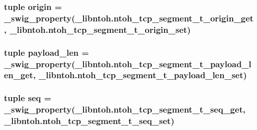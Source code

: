 \hypertarget{classlibntoh_1_1ntoh__tcp__segment__t_a8b9d7517c215a6690dc57a59f2e58a46}{
\subsubsection[{origin}]{\setlength{\rightskip}{0pt plus 5cm}tuple origin = {\bf \-\_\-swig\-\_\-property}(\-\_\-libntoh.\-ntoh\-\_\-tcp\-\_\-segment\-\_\-t\-\_\-origin\-\_\-get, \-\_\-libntoh.\-ntoh\-\_\-tcp\-\_\-segment\-\_\-t\-\_\-origin\-\_\-set)\hspace{0.3cm}{\ttfamily [static]}}}\label{classlibntoh_1_1ntoh__tcp__segment__t_a8b9d7517c215a6690dc57a59f2e58a46}
\hypertarget{classlibntoh_1_1ntoh__tcp__segment__t_a2d1aae70ae5f00aa8688e5a4004af497}{
\subsubsection[{payload\-\_\-len}]{\setlength{\rightskip}{0pt plus 5cm}tuple payload\-\_\-len = {\bf \-\_\-swig\-\_\-property}(\-\_\-libntoh.\-ntoh\-\_\-tcp\-\_\-segment\-\_\-t\-\_\-payload\-\_\-len\-\_\-get, \-\_\-libntoh.\-ntoh\-\_\-tcp\-\_\-segment\-\_\-t\-\_\-payload\-\_\-len\-\_\-set)\hspace{0.3cm}{\ttfamily [static]}}}\label{classlibntoh_1_1ntoh__tcp__segment__t_a2d1aae70ae5f00aa8688e5a4004af497}
\hypertarget{classlibntoh_1_1ntoh__tcp__segment__t_a716df55a3150c1225ef8612669f6b901}{
\subsubsection[{seq}]{\setlength{\rightskip}{0pt plus 5cm}tuple seq = {\bf \-\_\-swig\-\_\-property}(\-\_\-libntoh.\-ntoh\-\_\-tcp\-\_\-segment\-\_\-t\-\_\-seq\-\_\-get, \-\_\-libntoh.\-ntoh\-\_\-tcp\-\_\-segment\-\_\-t\-\_\-seq\-\_\-set)\hspace{0.3cm}{\ttfamily [static]}}}\label{classlibntoh_1_1ntoh__tcp__segment__t_a716df55a3150c1225ef8612669f6b901}
